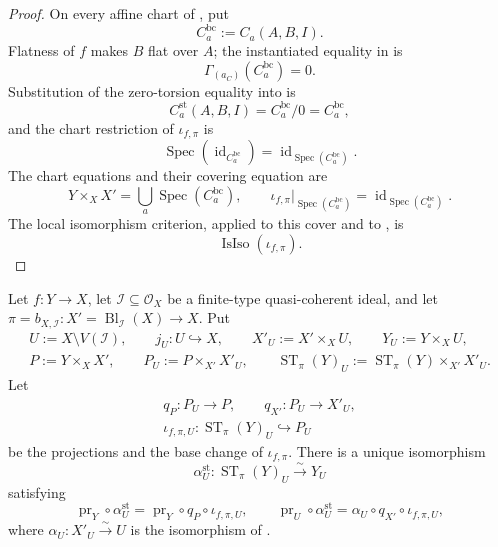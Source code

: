 \begin{proof}
  On every affine chart of
  , put
  \[
    C_a^{\mathrm{bc}}:=C_a(A,B,I).
  \]
  Flatness of $f$ makes $B$ flat over $A$; the instantiated equality in
   is
  \[
    \Gamma_{(a_C)}(C_a^{\mathrm{bc}})=0.
  \]
  Substitution of the zero-torsion equality into
   is
  \[
    C_a^{\mathrm{st}}(A,B,I)
      =C_a^{\mathrm{bc}}/0=C_a^{\mathrm{bc}},
  \]
  and the chart restriction of $\iota_{f,\pi}$ is
  \[
    \operatorname{Spec}(\operatorname{id}_{C_a^{\mathrm{bc}}})
      =\operatorname{id}_{\operatorname{Spec}(C_a^{\mathrm{bc}})}.
  \]
  The chart equations and their covering equation are
  \[
    Y\times_XX'=\bigcup_a\operatorname{Spec}(C_a^{\mathrm{bc}}),\qquad
    \iota_{f,\pi}|_{\operatorname{Spec}(C_a^{\mathrm{bc}})}
      =\operatorname{id}_{\operatorname{Spec}(C_a^{\mathrm{bc}})}.
  \]
  The local isomorphism criterion, applied to this cover and to
  , is
  \[
    \operatorname{IsIso}(\iota_{f,\pi}).
  \]
\end{proof}

\begin{lemma}
  \label{lemma:nagata-strict-transform-over-complement}

  Let $f\colon Y\to X$, let
  $\mathcal I\subseteq\mathcal O_X$ be a finite-type quasi-coherent ideal,
  and let
  $\pi=b_{X,\mathcal I}\colon X'=\operatorname{Bl}_{\mathcal I}(X)\to X$.
  Put
  \[
  \begin{gathered}
    U:=X\setminus V(\mathcal I),\qquad
    j_U\colon U\hookrightarrow X,\qquad
    X'_U:=X'\times_XU,\qquad
    Y_U:=Y\times_XU,\\
    P:=Y\times_XX',\qquad
    P_U:=P\times_{X'}X'_U,\qquad
    \operatorname{ST}_\pi(Y)_U
      :=\operatorname{ST}_\pi(Y)\times_{X'}X'_U.
  \end{gathered}
  \]
  Let
  \[
  \begin{gathered}
    q_P\colon P_U\to P,\qquad q_{X'}\colon P_U\to X'_U,\\
    \iota_{f,\pi,U}\colon\operatorname{ST}_\pi(Y)_U\hookrightarrow P_U
  \end{gathered}
  \]
  be the projections and the base change of $\iota_{f,\pi}$.
  There is a unique isomorphism
  \[
    \alpha^{\mathrm{st}}_U\colon
      \operatorname{ST}_\pi(Y)_U\xrightarrow{\sim}Y_U
  \]
  satisfying
  \[
    \operatorname{pr}_Y\circ\alpha^{\mathrm{st}}_U
      =\operatorname{pr}_Y\circ q_P\circ\iota_{f,\pi,U},
    \qquad
    \operatorname{pr}_U\circ\alpha^{\mathrm{st}}_U
      =\alpha_U\circ q_{X'}\circ\iota_{f,\pi,U},
  \]
  where $\alpha_U\colon X'_U\xrightarrow{\sim}U$ is the isomorphism of
  .
\end{lemma}

